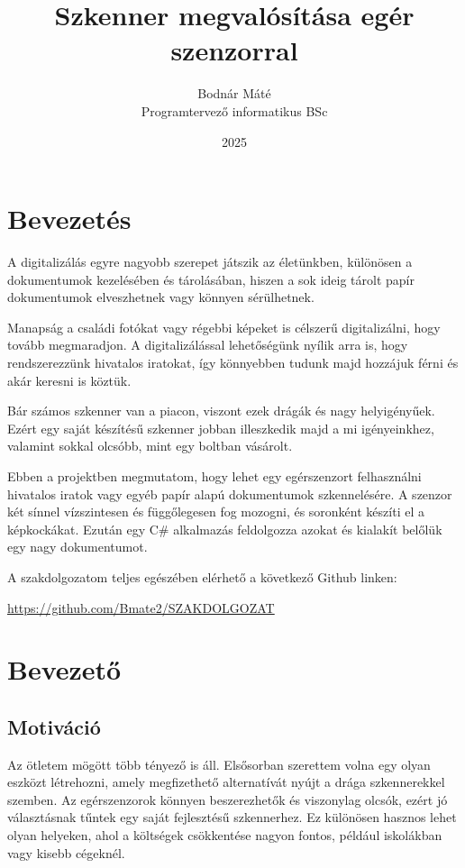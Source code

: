 \documentclass[]{thesis-ekf}
\theoremstyle{definition}
\theoremstyle{remark}
\begin{document}
\title{Szkenner megvalósítása egér szenzorral}
\author{Bodnár Máté\\Programtervező informatikus BSc}
\date{2025}
\maketitle

\tableofcontents

\chapter*{Bevezetés}
A digitalizálás egyre nagyobb szerepet játszik az életünkben, különösen a dokumentumok kezelésében és tárolásában, hiszen a sok ideig tárolt papír dokumentumok elveszhetnek vagy könnyen sérülhetnek.

Manapság a családi fotókat vagy régebbi képeket is célszerű digitalizálni, hogy tovább megmaradjon. A digitalizálással lehetőségünk nyílik arra is, hogy rendszerezzünk hivatalos iratokat, így könnyebben tudunk majd hozzájuk férni és akár keresni is köztük. 

Bár számos szkenner van a piacon, viszont ezek drágák és nagy helyigényűek. Ezért egy saját készítésű szkenner jobban illeszkedik majd a mi igényeinkhez, valamint sokkal olcsóbb, mint egy boltban vásárolt. 

Ebben a projektben megmutatom, hogy lehet egy egérszenzort felhasználni hivatalos iratok vagy egyéb papír alapú dokumentumok szkennelésére. A szenzor két sínnel vízszintesen és függőlegesen fog mozogni, és soronként készíti el a képkockákat. Ezután egy C\# alkalmazás feldolgozza azokat és kialakít belőlük egy nagy dokumentumot.

A szakdolgozatom teljes egészében elérhető a következő Github linken:

\url{https://github.com/Bmate2/SZAKDOLGOZAT}

\chapter{Bevezető}

\section{Motiváció}
Az ötletem mögött több tényező is áll. Elsősorban szerettem volna egy olyan eszközt létrehozni, amely megfizethető alternatívát nyújt a drága szkennerekkel szemben. Az egérszenzorok könnyen beszerezhetők és viszonylag olcsók, ezért jó választásnak tűntek egy saját fejlesztésű szkennerhez. Ez különösen hasznos lehet olyan helyeken, ahol a költségek csökkentése nagyon fontos, például iskolákban vagy kisebb cégeknél.
\end{document}
